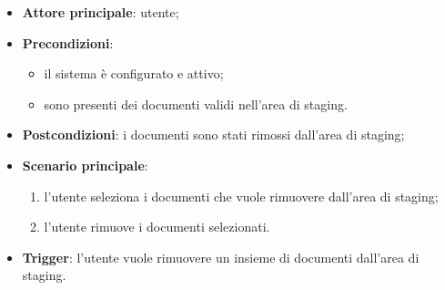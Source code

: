 \documentclass[10pt, a4paper]{article}
\begin{document}
    \begin{itemize}
        \item \textbf{Attore principale}: utente;
        \item \textbf{Precondizioni}:
            \begin{itemize}
                \item il sistema è configurato e attivo;
                \item sono presenti dei documenti validi nell’area di staging.
            \end{itemize}
        \item \textbf{Postcondizioni}: i documenti sono stati rimossi dall’area di staging;
        \item \textbf{Scenario principale}: 
            \begin{enumerate}
                \item l’utente seleziona i documenti che vuole rimuovere dall’area di staging;
                \item l’utente rimuove i documenti selezionati.
            \end{enumerate}
        \item \textbf{Trigger}: l’utente vuole rimuovere un insieme di documenti dall’area di staging.
    \end{itemize}
\end{document}
